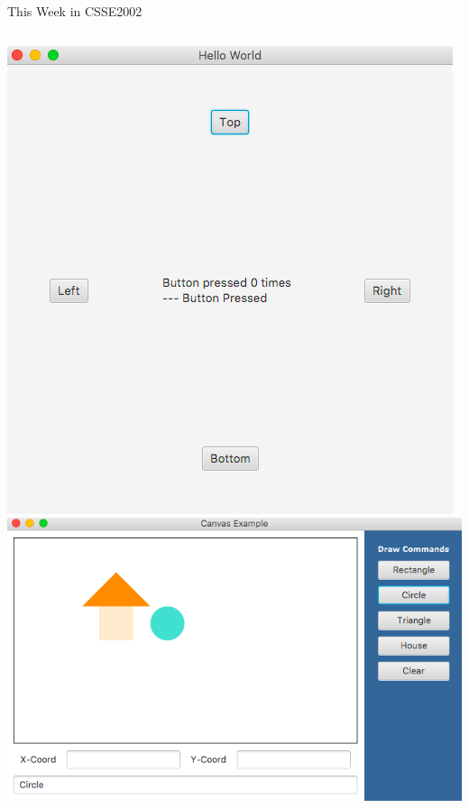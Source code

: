 \begin{frame}[t, fragile]{This Week in CSSE2002}
\begin{onlyenv}
\begin{columns}[onlytextwidth]
\includegraphics[scale=0.25]{resources/week11prac1}\\[20pt]
\includegraphics[scale=0.25]{resources/week11prac2}\\[20pt]
\end{columns}

\end{onlyenv}

\end{frame}


